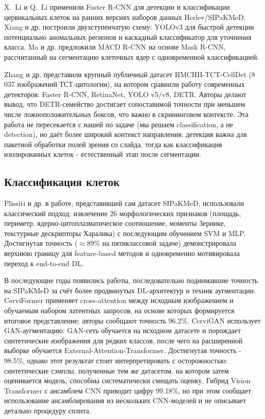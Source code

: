 \documentclass[14pt,a4paper]{extreport}
\begin{document}
X.~Li и Q.~Li \cite{li2019detection} применили Faster R-CNN для детекции и
классификации цервикальных клеток на ранних версиях наборов данных
Herlev/SIPaKMeD. Xiang и др. \cite{xiang2020novel} построили двухступенчатую
схему: YOLOv3 для быстрой детекции потенциально аномальных регионов и
каскадный классификатор для уточнения класса. Ma и др. \cite{ma2020macd}
предложили MACD R-CNN на основе Mask R-CNN, рассчитанный на сегментацию
клеточных ядер с одновременной классификацией.

Zhang и др. \cite{zhang2025large} представили крупный публичный датасет
HMCHH-TCT-CellDet (8\,037 изображений ТСТ-цитологии), на котором
сравнили работу современных детекторов: Faster R-CNN, RetinaNet, YOLO
v5/v8, DETR. Авторы делают вывод, что DETR-семейство достигает
сопоставимой точности при меньшем числе ложноположительных боксов, что
важно в скрининговом контексте. Эта работа не пересекается с нашей по
задаче (мы решаем classification, а не detection), но даёт более широкий
контекст направления: детекция важна для пакетной обработки полей зрения
со слайда, тогда как классификация изолированных клеток - естественный
этап после сегментации.

\subsection{Классификация клеток}

Plissiti и др. \cite{plissiti2018sipakmed} в работе, представившей сам
датасет SIPaKMeD, использовали классический подход: извлечение 26
морфологических признаков (площадь, периметр, ядерно-цитоплазматическое
соотношение, моменты Зернике, текстурные дескрипторы Харалика) с
последующим обучением SVM и MLP. Достигнутая точность ($\approx 89$\% на
пятиклассовой задаче) демонстрировала верхнюю границу для feature-based
методов и одновременно мотивировала переход к end-to-end DL.

В последующие годы появились работы, последовательно поднимавшие точность
на SIPaKMeD за счёт более продвинутых DL-архитектур и техник аугментации.
CerviFormer \cite{cerviformer2023} применяет cross-attention между
исходным изображением и обучаемым набором латентных запросов, на основе
которых формируется итоговое представление; авторы сообщают точность
96.2\%. CerviGAN \cite{cervigan2025} использует GAN-аугментацию: GAN-сеть
обучается на исходном датасете и порождает синтетические изображения
для редких классов, после чего на расширенной выборке обучается
External-Attention-Transformer. Достигнутая точность - 98.5\%, однако
этот результат стоит интерпретировать с осторожностью: синтетические
сэмплы, полученные тем же датасетом, на котором затем оценивается модель,
способны систематически смещать оценку. Гибрид Vision Transformer с
ансамблем CNN \cite{hybridvit2025} приводит цифру 99.18\%, но при этом
сообщает использование ансамблирования из нескольких CNN-моделей и не
описывает детально процедуру сплита.
\end{document}
